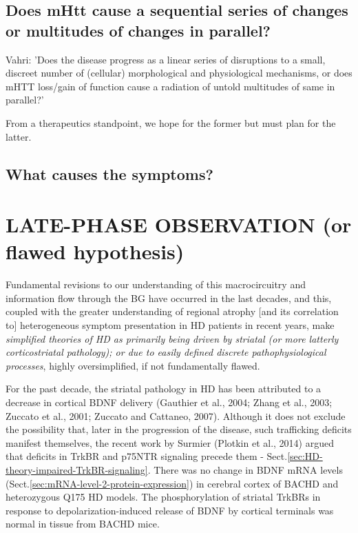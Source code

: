 \subsection{Does mHtt cause a sequential series of changes or multitudes of
changes in parallel?}

Vahri: 'Does the disease progress as a linear series of disruptions to a small,
discreet number of (cellular) morphological and physiological mechanisms, or
does mHTT loss/gain of function cause a radiation of untold multitudes of same
in parallel?'

From a therapeutics standpoint, we hope for the former but must plan for the
latter.

\subsection{What causes the symptoms?}



\section{LATE-PHASE OBSERVATION (or flawed hypothesis)}
\label{sec:HD-theory-flawed-theories}

Fundamental revisions to our understanding of this macrocircuitry and
information flow through the BG have occurred in the last decades, and this,
coupled with the greater understanding of regional atrophy [and its correlation
to] heterogeneous symptom presentation in HD patients in recent years, make {\it
simplified theories of HD as primarily being driven by striatal (or more
latterly corticostriatal pathology); or due to easily defined discrete
pathophysiological processes}, highly oversimplified, if not fundamentally
flawed.

For the past decade, the striatal pathology in HD has been attributed to a
decrease in cortical BDNF delivery (Gauthier et al., 2004; Zhang et al., 2003;
Zuccato et al., 2001; Zuccato and Cattaneo, 2007). Although it does not exclude
the possibility that, later in the progression of the disease, such trafficking
deficits manifest themselves, the recent work by Surmier (Plotkin et al., 2014)
argued that deficits in TrkBR and p75NTR signaling precede them -
Sect.\ref{sec:HD-theory-impaired-TrkBR-signaling}.
There was no change in BDNF mRNA levels
(Sect.\ref{sec:mRNA-level-2-protein-expression}) in cerebral cortex of BACHD and
heterozygous Q175 HD models. The phosphorylation of striatal TrkBRs in response
to depolarization-induced release of BDNF by cortical terminals was normal in
tissue from BACHD mice.

